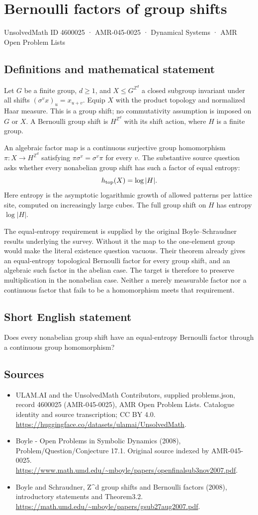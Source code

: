 \documentclass[11pt,a4paper]{article}
\begin{document}
\section*{Bernoulli factors of group shifts}\label{4600025}
{\small UnsolvedMath ID 4600025 · AMR-045-0025 · Dynamical Systems · AMR Open Problem Lists}
\subsection{Definitions and mathematical statement}
Let $G$ be a finite group, $d\ge1$, and $X\le G^{\mathbb Z^d}$ a closed
subgroup invariant under all shifts $(\sigma^v x)_u=x_{u+v}$. Equip $X$
with the product topology and normalized Haar measure. This is a group
shift; no commutativity assumption is imposed on $G$ or $X$.
A Bernoulli group shift is $H^{\mathbb Z^d}$ with its shift action,
where $H$ is a finite group.

An algebraic factor map is a continuous surjective group homomorphism
$\pi:X\to H^{\mathbb Z^d}$ satisfying
$\pi\sigma^v=\sigma^v\pi$ for every $v$. The substantive source question
asks whether every nonabelian group shift has such a factor of equal
entropy:
\[
 h_{\rm top}(X)=\log|H|.
\]
Here entropy is the asymptotic logarithmic growth of allowed patterns
per lattice site, computed on increasingly large cubes. The full group
shift on $H$ has entropy $\log|H|$.

The equal-entropy requirement is supplied by the original
Boyle–Schraudner results underlying the survey. Without it the map to
the one-element group would make the literal existence question
vacuous. Their theorem already gives an equal-entropy topological
Bernoulli factor for every group shift, and an algebraic such factor
in the abelian case. The target is therefore to preserve multiplication
in the nonabelian case. Neither a merely measurable factor nor a
continuous factor that fails to be a homomorphism meets that requirement.
\subsection{Short English statement}
Does every nonabelian group shift have an equal-entropy Bernoulli factor through a continuous group homomorphism?
\subsection{Sources}
\begin{itemize}
\item[S1] ULAM.AI and the UnsolvedMath Contributors, supplied problems.json, record 4600025 (AMR-045-0025), AMR Open Problem Lists. Catalogue identity and source transcription; CC BY 4.0.
\url{https://huggingface.co/datasets/ulamai/UnsolvedMath}.
\item[S2] Boyle - Open Problems in Symbolic Dynamics (2008), Problem/Question/Conjecture 17.1. Original source indexed by AMR-045-0025.
\url{https://www.math.umd.edu/~mboyle/papers/openfinalsub3nov2007.pdf}.
\item[S3] Boyle and Schraudner, Z\textasciicircum{}d group shifts and Bernoulli factors (2008), introductory statements and Theorem3.2.
\url{https://math.umd.edu/~mboyle/papers/gsub27aug2007.pdf}.
\end{itemize}
\end{document}
